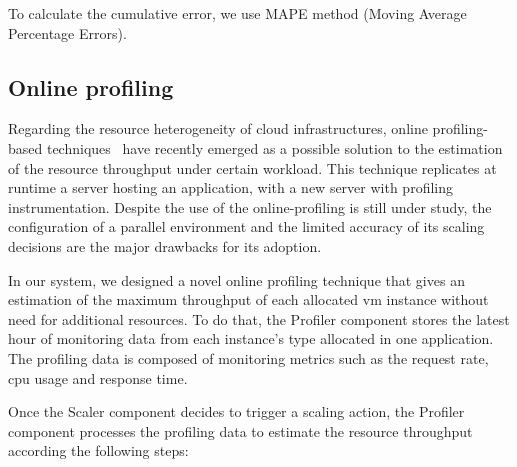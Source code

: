 To calculate the cumulative error, we use MAPE method  (Moving Average Percentage Errors).

\subsection{Online profiling \label{profiling}}

Regarding the resource heterogeneity of cloud infrastructures, online profiling-based techniques~\cite{kaviani_profiling-as--service:_2011} have recently emerged as a possible solution to the estimation of the resource throughput under certain workload. This technique replicates at runtime a server hosting an application, with a new server with profiling instrumentation. Despite the use of the online-profiling is still under study, the configuration of a parallel environment and the limited accuracy of its scaling decisions are the major drawbacks for its adoption.

In our system, we designed a novel online profiling technique that gives an estimation of the maximum throughput of each allocated vm instance without need for additional resources. To do that, the Profiler component stores the latest hour of monitoring data from each instance's type allocated in one application. The profiling data is composed of monitoring metrics such as the request rate, cpu usage and response time. 

Once the Scaler component decides to trigger a scaling action, the Profiler component processes the profiling data to estimate the resource throughput according the following steps:

